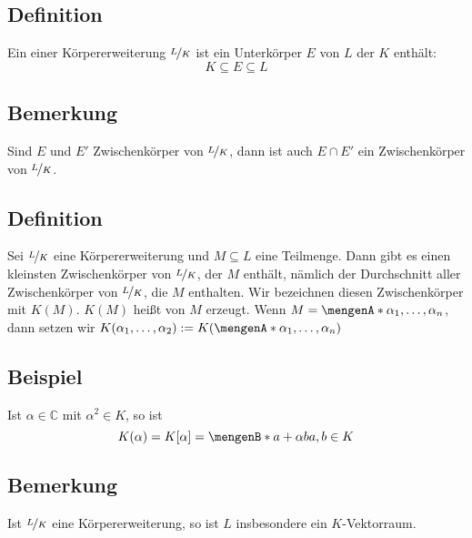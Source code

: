 \subsection[Definition: Zwischenkörper]{Definition} %
\label{sub:11.3}
Ein  einer Körpererweiterung $\nicefrac{L}{K}$ ist ein Unterkörper $E$ von $L$ der $K$ enthält:
\[
	K \subseteq E \subseteq L
\] 

\subsection[Bemerkung über den Schnitt von Zwischenkörpern]{Bemerkung} %
\label{sub:11.4}
Sind $E$ und $E'$ Zwischenkörper von $\nicefrac{L}{K}$, dann ist auch $E \cap E'$ ein Zwischenkörper von $\nicefrac{L}{K}$.

\subsection[Definition: Von Teilmenge erzeugter kleinster Zwischenkörper]{Definition} %
\label{sub:11.5}
Sei $\nicefrac{L}{K}$ eine Körpererweiterung und $M \subseteq L$ eine Teilmenge. Dann gibt es einen kleinsten Zwischenkörper von $\nicefrac{L}{K}$, der $M$ enthält, nämlich
der Durchschnitt aller Zwischenkörper von $\nicefrac{L}{K}$, die $M$ enthalten. Wir bezeichnen diesen Zwischenkörper mit $K(M)$. $K(M)$ heißt von $M$ erzeugt. Wenn 
$M= \set{\alpha_1, \ldots ,\alpha_n} $, dann setzen wir $K(\alpha_1, \ldots , \alpha_2) := K(\set{\alpha_1, \ldots , \alpha_n} )$

\subsection[Beispiel eines erzeugten Zwischenkörpers aus dem vorherigen Kapitel]{Beispiel} %
\label{sub:11.6}
Ist $\alpha \in \mathds{C}$ mit $\alpha^2 \in K$, so ist 
\[
	K(\alpha) = K[\alpha] = \set[a+ \alpha b]{a,b \in K} 
\]

\subsection[Bemerkung: KEs lassen sich als Vektorraum über dem Basiskörper auffassen]{Bemerkung} %
\label{sub:11.7}
Ist $\nicefrac{L}{K}$ eine Körpererweiterung, so ist $L$ insbesondere ein $K$-Vektorraum. 

